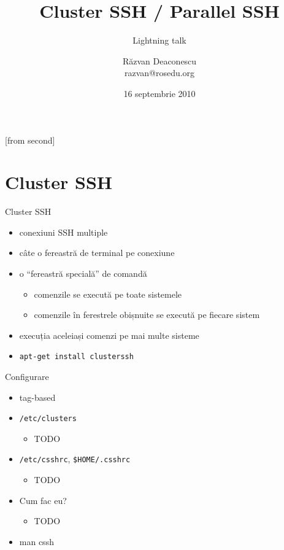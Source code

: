 \documentclass{beamer}
\title[Cluster SSH / Parallel SSH]{Cluster SSH / Parallel SSH}
\subtitle{Lightning talk}
\institute{Întâlnirile lunare RLUG -- Septembrie 2010}
\author[Răzvan Deaconescu]{Răzvan Deaconescu\\
	razvan@rosedu.org}
\date{16 septembrie 2010}
\begin{document}
[from second]


\frame{\titlepage}

\section{Cluster SSH}

\frame{\tableofcontents[currentsection]}

\begin{frame}{Cluster SSH}
	\begin{itemize}		%
		\item conexiuni SSH multiple
		\item câte o fereastră de terminal pe conexiune
		\item o ``fereastră specială'' de comandă
			\begin{itemize}
				\item comenzile se execută pe toate sistemele
				\item comenzile în ferestrele obișnuite se execută pe fiecare
				sistem
			\end{itemize}
		\item execuția aceleiași comenzi pe mai multe sisteme
		\item \texttt{apt-get install clusterssh}
	\end{itemize}
\end{frame}

\begin{frame}{Configurare}
	\begin{itemize}
		\item tag-based
		\item \texttt{/etc/clusters}
			\begin{itemize}
				\item TODO
			\end{itemize}
		\item \texttt{/etc/csshrc}, \texttt{\$HOME/.csshrc}
			\begin{itemize}
				\item TODO
			\end{itemize}
		\item Cum fac eu?
			\begin{itemize}
				\item TODO
			\end{itemize}
		\item man cssh
	\end{itemize}
\end{frame}
\end{document}
